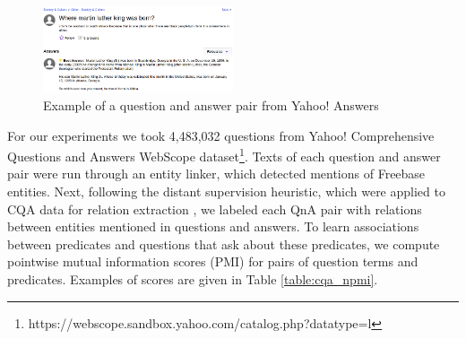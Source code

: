 \begin{figure}
\centering
\includegraphics[width=0.5\textwidth]{img/cqa_example}
\caption{Example of a question and answer pair from Yahoo! Answers}
\label{fig:cqa_example}
\end{figure}

For our experiments we took 4,483,032 questions from Yahoo! Comprehensive Questions and Answers WebScope dataset\footnote{https://webscope.sandbox.yahoo.com/catalog.php?datatype=l}.
Texts of each question and answer pair were run through an entity linker, which detected mentions of Freebase entities.
Next, following the distant supervision heuristic, which were applied to CQA data for relation extraction \cite{savenkov-EtAl:2015:SRW}, we labeled each QnA pair with relations between entities mentioned in questions and answers.
To learn associations between predicates and questions that ask about these predicates, we compute pointwise mutual information scores (PMI) for pairs of question terms and predicates.
Examples of scores are given in Table \ref{table:cqa_npmi}.

